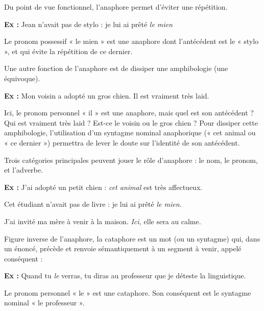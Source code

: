 Du point de vue fonctionnel, l’anaphore permet d’éviter une répétition.

\textbf{Ex :} Jean n’avait pas de stylo : je lui ai prêté \textit{le mien}

Le pronom possessif « le mien » est une anaphore dont l’antécédent est le « stylo », et qui évite la répétition de ce dernier.

Une autre fonction de l’anaphore est de dissiper une amphibologie (une équivoque).

\textbf{Ex :} Mon voisin a adopté un gros chien. Il est vraiment très laid.

Ici, le pronom personnel « il » est une anaphore, mais quel est son antécédent ? Qui est vraiment très laid ? Est-ce le voisin ou le gros chien ? Pour dissiper cette amphibologie, l’utilisation d’un syntagme nominal anaphorique (« cet animal ou « ce dernier ») permettra de lever le doute sur l’identité de son antécédent.

Trois catégories principales peuvent jouer le rôle d’anaphore : le nom, le pronom, et l’adverbe.

\textbf{Ex :} J’ai adopté un petit chien : \textit{cet animal} est très affectueux.

\hspace*{1.5em}Cet étudiant n’avait pas de livre : je lui ai prêté \textit{le mien.}

\hspace*{1.5em}J’ai invité ma mère à venir à la maison. \textit{Ici,} elle sera au calme.

Figure inverse de l’anaphore, la cataphore est un mot (ou un syntagme) qui, dans un énoncé, précède et renvoie sémantiquement à un segment à venir, appelé conséquent :

\textbf{Ex :} Quand tu \textit{le} verras, tu diras au professeur que je déteste la linguistique.

Le pronom personnel « le » est une cataphore. Son conséquent est le syntagme nominal « le professeur ».

